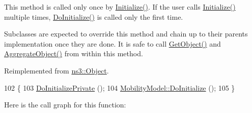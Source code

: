 This method is called only once by \hyperlink{classns3_1_1Object_af4411cb29971772fcd09203474a95078}{Initialize()}. If the user calls \hyperlink{classns3_1_1Object_af4411cb29971772fcd09203474a95078}{Initialize()} multiple times, \hyperlink{classns3_1_1SteadyStateRandomWaypointMobilityModel_a9e27c674274fb626dca8e0a6ddf3f8f3}{Do\+Initialize()} is called only the first time.

Subclasses are expected to override this method and chain up to their parent\textquotesingle{}s implementation once they are done. It is safe to call \hyperlink{classns3_1_1Object_a13e18c00017096c8381eb651d5bd0783}{Get\+Object()} and \hyperlink{classns3_1_1Object_a79dd435d300f3deca814553f561a2922}{Aggregate\+Object()} from within this method. 

Reimplemented from \hyperlink{classns3_1_1Object_af8482a521433409fb5c7f749398c9dbe}{ns3\+::\+Object}.


\begin{DoxyCode}
102 \{
103   \hyperlink{classns3_1_1SteadyStateRandomWaypointMobilityModel_a661b708216d6f6c38443d061b0d02c96}{DoInitializePrivate} ();
104   \hyperlink{classns3_1_1Object_af8482a521433409fb5c7f749398c9dbe}{MobilityModel::DoInitialize} ();
105 \}
\end{DoxyCode}


Here is the call graph for this function\+:


